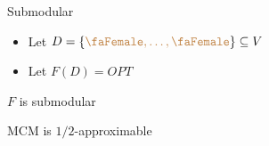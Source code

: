 \begin{frame}{Submodular}
\begin{itemize}[<+>]
  \item Let $D = \{{\color{brown}\text{\faFemale}, \ldots, \text{\faFemale}}\} \subseteq V$
  \item Let $F(D) = OPT$
\end{itemize}

\onslide<+>
\begin{theorem}
$F$ is submodular
\end{theorem}

\onslide<+>
\begin{corollary}
MCM is $1/2$-approximable
\end{corollary}



\end{frame}
